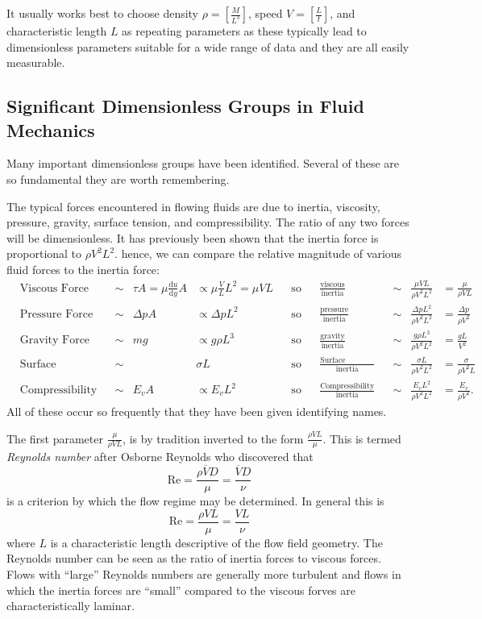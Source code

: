 It usually works best to choose density $\rho = \left[ \frac{M}{L^3} \right]$, speed $V = \left[ \frac{L}{t} \right]$, and characteristic length $L$ as repeating parameters as these typically lead to dimensionless parameters suitable for a wide range of data and they are all easily measurable. 

\subsection{Significant Dimensionless Groups in Fluid Mechanics} \label{sec:sigdim}
Many important dimensionless groups have been identified. Several of these are so fundamental they are worth remembering. 

The typical forces encountered in flowing fluids are due to inertia, viscosity, pressure, gravity, surface tension, and compressibility. The ratio of any two forces will be dimensionless. It has previously been shown that the inertia force is proportional to $\rho V^2 L^2$. hence, we can compare the relative magnitude of various fluid forces to the inertia force:
\begin{align*}
  &\text{Viscous Force} & &\sim  & \tau A = \mu \frac{\mathrm{d}u}{\mathrm{d}y} A &\propto \mu \frac{V}{L}L^2 = \mu V L & &\text{so} & &\frac{\text{viscous}}{\text{inertia}} & &\sim & \frac{\mu VL}{\rho V^2L^2} &= \frac{\mu}{\rho V L} \\
  &\text{Pressure Force} & &\sim & \Delta p A &\propto \Delta pL^2 & &\text{so} & &\frac{\text{pressure}}{\text{inertia}} &&\sim& \frac{\Delta p L^2}{\rho V^2 L^2} &= \frac{\Delta p}{\rho V^2} \\
  &\text{Gravity Force} & &\sim & mg &\propto g\rho L^3 & &\text{so} & &\frac{\text{gravity}}{\text{inertia}} &&\sim& \frac{g\rho L^3}{\rho V^2L^2} &= \frac{gL}{V^2} \\
  &\text{Surface Tension} & &\sim &  &\sigma L & &\text{so} & &\frac{\text{Surface Tension}}{\text{inertia}} &&\sim& \frac{\sigma L}{\rho V^2 L^2} &= \frac{\sigma}{\rho V^2 L}\\
  &\text{Compressibility Force} & &\sim & E_v A &\propto E_v L^2 & &\text{so} & &\frac{\text{Compressibility}}{\text{inertia}} &&\sim& \frac{E_v L^2}{\rho V^2 L^2} &= \frac{E_v}{\rho V^2}
.\end{align*}
All of these occur so frequently that they have been given identifying names.

The first parameter $\frac{\mu}{\rho VL}$, is by tradition inverted to the form $\frac{\rho VL}{\mu}$. This is termed \textit{Reynolds number} after Osborne Reynolds who discovered that
\[ 
\mathrm{Re} = \frac{\rho \overline{V} D}{\mu} = \frac{\overline{V} D}{\nu}
\]
is a criterion by which the flow regime may be determined. In general this is
\[ 
  \mathrm{Re} = \frac{\rho V L}{\mu} = \frac{VL}{\nu}
\]
where $L$ is a characteristic length descriptive of the flow field geometry. The Reynolds number can be seen as the ratio of inertia forces to viscous forces. Flows with ``large'' Reynolds numbers are generally more turbulent and flows in which the inertia forces are ``small'' compared to the viscous forves are characteristically laminar. 


